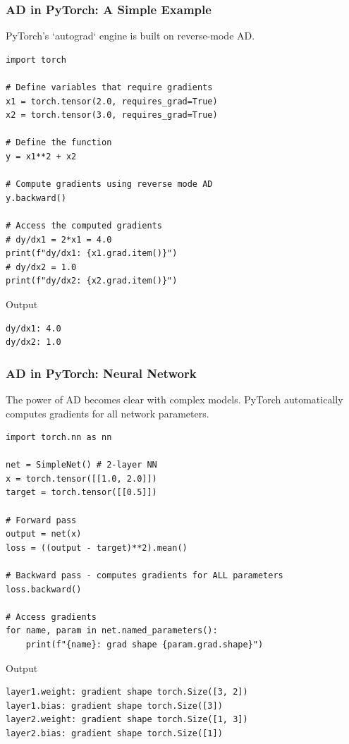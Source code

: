 \documentclass[notes]{beamer}
\begin{document}
\begin{frame}[fragile]
\frametitle{AD in PyTorch: A Simple Example}

PyTorch's `autograd` engine is built on reverse-mode AD.

\begin{lstlisting}[style=pythonstyle]
import torch

# Define variables that require gradients
x1 = torch.tensor(2.0, requires_grad=True)
x2 = torch.tensor(3.0, requires_grad=True)

# Define the function
y = x1**2 + x2

# Compute gradients using reverse mode AD
y.backward()

# Access the computed gradients
# dy/dx1 = 2*x1 = 4.0
print(f"dy/dx1: {x1.grad.item()}")
# dy/dx2 = 1.0
print(f"dy/dx2: {x2.grad.item()}")
\end{lstlisting}

\begin{block}{Output}
\begin{verbatim}
dy/dx1: 4.0
dy/dx2: 1.0
\end{verbatim}
\end{block}

\end{frame}

\begin{frame}[fragile]
\frametitle{AD in PyTorch: Neural Network}

The power of AD becomes clear with complex models. PyTorch automatically computes gradients for all network parameters.

\begin{lstlisting}[style=pythonstyle]
import torch.nn as nn

net = SimpleNet() # 2-layer NN
x = torch.tensor([[1.0, 2.0]])
target = torch.tensor([[0.5]])

# Forward pass
output = net(x)
loss = ((output - target)**2).mean()

# Backward pass - computes gradients for ALL parameters
loss.backward()

# Access gradients
for name, param in net.named_parameters():
    print(f"{name}: grad shape {param.grad.shape}")
\end{lstlisting}

\begin{block}{Output}
\begin{verbatim}
layer1.weight: gradient shape torch.Size([3, 2])
layer1.bias: gradient shape torch.Size([3])
layer2.weight: gradient shape torch.Size([1, 3])
layer2.bias: gradient shape torch.Size([1])
\end{verbatim}
\end{block}

\end{frame}
\end{document}
